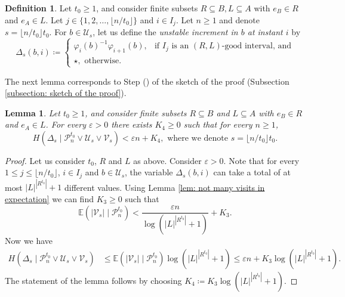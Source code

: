 \documentclass[reqno,oneside,11pt]{amsart}
\newcommand{\E}{\mathbb{E}}
\theoremstyle{plain}
\newtheorem{lem}[thm]{Lemma}
\theoremstyle{definition}
\newtheorem{defn}[thm]{Definition} %
\begin{document}
\begin{defn}\label{def: increments at unstable points}
	Let $t_0\ge 1$, and consider finite subsets $R\subseteq B, L\subseteq A$ with $e_B\in R$ and $e_A\in L$. Let $j\in \{1,2,\ldots, \lfloor n/t_0 \rfloor\}$ and $i\in I_j$. Let $n\ge 1$ and denote $s=\lfloor n/t_0\rfloor t_0$. For $b\in \mathcal{U}_s$, let us define the \emph{unstable increment in $b$ at instant $i$} by
	\begin{equation*}
		\Delta_s(b,i)\coloneqq \begin{cases}
			\varphi_{i}(b)^{-1} \varphi_{i+1}(b),&\text{if }I_j\text{ is an }(R,L)\text{-good interval, and}\\
			\star, \text{ otherwise.}
		\end{cases}
	\end{equation*}
\end{defn}


The next lemma corresponds to Step () of the sketch of the proof (Subsection \ref{subsection: sketch of the proof}).
\begin{lem}\label{lem: increments at unstable points have small entropy}	Let $t_0\ge 1$, and consider finite subsets $R\subseteq B$ and $L\subseteq A$ with $e_B\in R$ and $e_A\in L$. For every $\varepsilon>0$ there exists $K_4\ge 0$ such that for every $n\ge 1$,
	\begin{equation*}
		H(\Delta_s \mid \mathcal{P}_n^{t_0}\vee \mathcal{U}_s\vee \mathcal{V}_s)<\varepsilon n +K_4, \text{ where we denote }s=\lfloor n/t_0\rfloor t_0.
	\end{equation*}
	
\end{lem}
\begin{proof}
	Let us consider $t_0$, $R$ and $L$ as above. Consider $\varepsilon>0$. Note that for every $1\le j \le \lfloor n/t_0\rfloor$, $i\in I_j$ and $b\in \mathcal{U}_s$, the variable $\Delta_s(b,i)$ can take a total of at most $|L|^{|R^{t_0}|}+1$ different values. Using Lemma \ref{lem: not many visits in expectation} we can find $K_3\ge 0$ such that 
	\begin{equation*}
		\E(|\mathcal{V}_s|\mid \mathcal{P}_n^{t_0})<\frac{\varepsilon n}{\log\left(|L|^{|R^{t_0}|}+1\right)}+K_3.
	\end{equation*}
	Now we have
	\begin{align*}
		H(\Delta_s \mid \mathcal{P}_n^{t_0}\vee \mathcal{U}_s\vee \mathcal{V}_s)&\le \E(|\mathcal{V}_s|\mid \mathcal{P}_n^{t_0})\log\left(|L|^{|R^{t_0}|}+1\right)\le \varepsilon n +K_3\log\left(|L|^{|R^{t_0}|}+1\right).
	\end{align*}
	The statement of the lemma follows by choosing $K_4\coloneqq K_3\log\left(|L|^{|R^{t_0}|}+1\right)$.
\end{proof}
\end{document}
